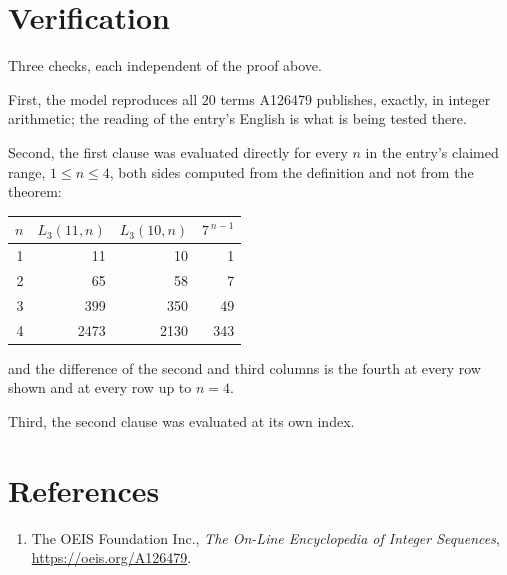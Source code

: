 \documentclass[11pt,a4paper]{article}
\theoremstyle{plain}
\theoremstyle{definition}
\begin{document}
\section{Verification}

Three checks, each independent of the proof above.

First, the model reproduces all $20$ terms A126479 publishes, exactly, in integer
arithmetic; the reading of the entry's English is what is being tested there.

Second, the first clause was evaluated directly for every $n$ in the entry's claimed range,
$1\le n\le4$, both sides computed from the definition and not from the theorem:

\begin{center}
\begin{tabular}{rrrr}
$n$ & $L_{3}(11,n)$ & $L_{3}(10,n)$ & $7^{\,n-1}$ \\ \hline
1 & 11 & 10 & 1 \\
2 & 65 & 58 & 7 \\
3 & 399 & 350 & 49 \\
4 & 2473 & 2130 & 343 \\
\end{tabular}
\end{center}

\noindent and the difference of the second and third columns is the fourth at every row shown
and at every row up to $n=4$.

Third, the second clause was evaluated at its own index.

\section*{References}
\begin{enumerate}
\item The OEIS Foundation Inc., \emph{The On-Line Encyclopedia of Integer Sequences},
\url{https://oeis.org/A126479}.
\end{enumerate}
\end{document}
